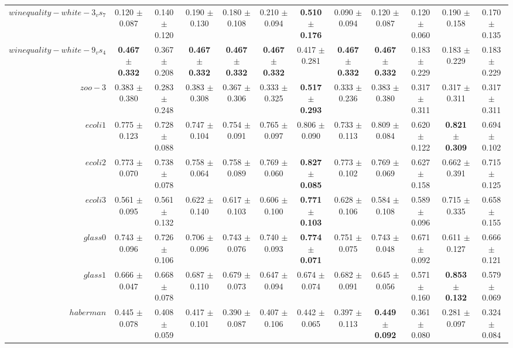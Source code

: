 \begin{table}[!ht]
{\begin{tabular}{r c c c c c c c c c c c}
$winequality-white-3_vs_7$ & 0.120 $\pm$ 0.087 & 0.140 $\pm$ 0.120 & 0.190 $\pm$ 0.130 & 0.180 $\pm$ 0.108 & 0.210 $\pm$ 0.094 & \textbf{0.510 $\pm$ 0.176} & 0.090 $\pm$ 0.094 & 0.120 $\pm$ 0.087 & 0.120 $\pm$ 0.060 & 0.190 $\pm$ 0.158 & 0.170 $\pm$ 0.135 \\
$winequality-white-9_vs_4$ & \textbf{0.467 $\pm$ 0.332} & 0.367 $\pm$ 0.208 & \textbf{0.467 $\pm$ 0.332} & \textbf{0.467 $\pm$ 0.332} & \textbf{0.467 $\pm$ 0.332} & 0.417 $\pm$ 0.281 & \textbf{0.467 $\pm$ 0.332} & \textbf{0.467 $\pm$ 0.332} & 0.183 $\pm$ 0.229 & 0.183 $\pm$ 0.229 & 0.183 $\pm$ 0.229 \\
$zoo-3$ & 0.383 $\pm$ 0.380 & 0.283 $\pm$ 0.248 & 0.383 $\pm$ 0.308 & 0.367 $\pm$ 0.306 & 0.333 $\pm$ 0.325 & \textbf{0.517 $\pm$ 0.293} & 0.333 $\pm$ 0.236 & 0.383 $\pm$ 0.380 & 0.317 $\pm$ 0.311 & 0.317 $\pm$ 0.311 & 0.317 $\pm$ 0.311 \\
$ecoli1$ & 0.775 $\pm$ 0.123 & 0.728 $\pm$ 0.088 & 0.747 $\pm$ 0.104 & 0.754 $\pm$ 0.091 & 0.765 $\pm$ 0.097 & 0.806 $\pm$ 0.090 & 0.733 $\pm$ 0.113 & 0.809 $\pm$ 0.084 & 0.620 $\pm$ 0.122 & \textbf{0.821 $\pm$ 0.309} & 0.694 $\pm$ 0.102 \\
$ecoli2$ & 0.773 $\pm$ 0.070 & 0.738 $\pm$ 0.078 & 0.758 $\pm$ 0.064 & 0.758 $\pm$ 0.089 & 0.769 $\pm$ 0.060 & \textbf{0.827 $\pm$ 0.085} & 0.773 $\pm$ 0.102 & 0.769 $\pm$ 0.069 & 0.627 $\pm$ 0.158 & 0.662 $\pm$ 0.391 & 0.715 $\pm$ 0.125 \\
$ecoli3$ & 0.561 $\pm$ 0.095 & 0.561 $\pm$ 0.132 & 0.622 $\pm$ 0.140 & 0.617 $\pm$ 0.103 & 0.606 $\pm$ 0.100 & \textbf{0.771 $\pm$ 0.103} & 0.628 $\pm$ 0.106 & 0.584 $\pm$ 0.108 & 0.589 $\pm$ 0.096 & 0.715 $\pm$ 0.335 & 0.658 $\pm$ 0.155 \\
$glass0$ & 0.743 $\pm$ 0.096 & 0.726 $\pm$ 0.106 & 0.706 $\pm$ 0.096 & 0.743 $\pm$ 0.076 & 0.740 $\pm$ 0.093 & \textbf{0.774 $\pm$ 0.071} & 0.751 $\pm$ 0.075 & 0.743 $\pm$ 0.048 & 0.671 $\pm$ 0.092 & 0.611 $\pm$ 0.127 & 0.666 $\pm$ 0.121 \\
$glass1$ & 0.666 $\pm$ 0.047 & 0.668 $\pm$ 0.078 & 0.687 $\pm$ 0.110 & 0.679 $\pm$ 0.073 & 0.647 $\pm$ 0.094 & 0.674 $\pm$ 0.074 & 0.682 $\pm$ 0.091 & 0.645 $\pm$ 0.056 & 0.571 $\pm$ 0.160 & \textbf{0.853 $\pm$ 0.132} & 0.579 $\pm$ 0.069 \\
$haberman$ & 0.445 $\pm$ 0.078 & 0.408 $\pm$ 0.059 & 0.417 $\pm$ 0.101 & 0.390 $\pm$ 0.087 & 0.407 $\pm$ 0.106 & 0.442 $\pm$ 0.065 & 0.397 $\pm$ 0.113 & \textbf{0.449 $\pm$ 0.092} & 0.361 $\pm$ 0.080 & 0.281 $\pm$ 0.097 & 0.324 $\pm$ 0.084 \\

\end{tabular}}
\end{table}
